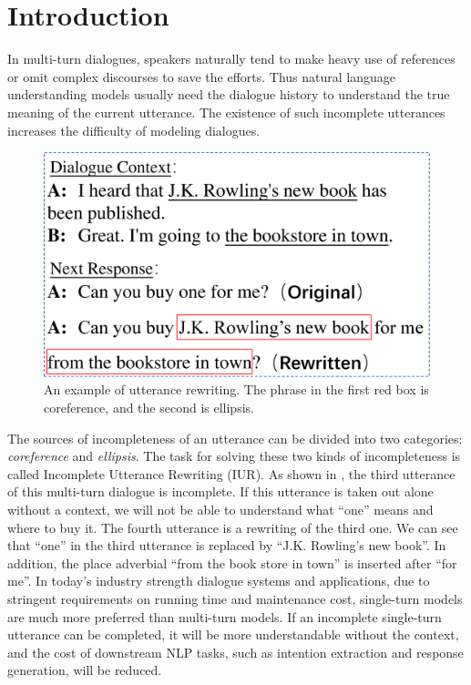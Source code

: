 \section{Introduction}

In multi-turn dialogues, 
speakers naturally tend to 
make heavy use of references or omit complex discourses to save the efforts.
Thus natural language understanding models usually
need the dialogue history to understand the true meaning 
of the current utterance.
The existence of such incomplete utterances increases the difficulty of modeling dialogues.

\begin{figure}[th]
        \centering
        \includegraphics[width=0.8\columnwidth]{rewrite-example.eps}
        \caption{An example of utterance rewriting. The phrase in the first red box is coreference, and the second is ellipsis.}
        \label{fig:rewrite-example}
\end{figure}


The sources of incompleteness of an utterance can be divided into 
two categories: \textit{coreference} and \textit{ellipsis}. 
The task for solving these two kinds of incompleteness is called
Incomplete Utterance Rewriting (IUR). 
As shown in , the third utterance of this multi-turn dialogue is incomplete. If this utterance is taken out alone without 
a context, 
we will not be able to 
understand what ``one'' means and where to buy it. The fourth utterance is a rewriting of the third one. We can see that ``one'' in the third utterance is replaced by ``J.K. Rowling's new book''. In addition, the place adverbial ``from the book store in town'' is inserted after ``for me''. %
In today's industry strength dialogue systems and applications, 
due to stringent requirements on running time and maintenance cost, 
single-turn models are much more preferred
than multi-turn models.
If an incomplete single-turn utterance can be completed, 
it will be more understandable without the context, 
and the cost of downstream NLP tasks, such as intention extraction and 
response generation, will be reduced.

